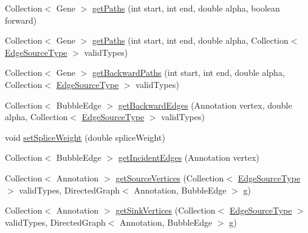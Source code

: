 \begin{DoxyCompactItemize}
Collection$<$ Gene $>$ \hyperlink{classbroad_1_1pda_1_1seq_1_1graph_1_1_chromosome_with_bubbles_j_graph_t_aa189999760ab15088e48c7fbcdc88bf0}{get\+Paths} (int start, int end, double alpha, boolean forward)
\item 
Collection$<$ Gene $>$ \hyperlink{classbroad_1_1pda_1_1seq_1_1graph_1_1_chromosome_with_bubbles_j_graph_t_afe50a9035a3a399d97bc80e5d68ae3ca}{get\+Paths} (int start, int end, double alpha, Collection$<$ \hyperlink{enumbroad_1_1pda_1_1seq_1_1graph_1_1_chromosome_with_bubbles_j_graph_t_1_1_edge_source_type}{Edge\+Source\+Type} $>$ valid\+Types)
\item 
Collection$<$ Gene $>$ \hyperlink{classbroad_1_1pda_1_1seq_1_1graph_1_1_chromosome_with_bubbles_j_graph_t_aeaf8d68a1b24e160b4ec49198d8029e5}{get\+Backward\+Paths} (int start, int end, double alpha, Collection$<$ \hyperlink{enumbroad_1_1pda_1_1seq_1_1graph_1_1_chromosome_with_bubbles_j_graph_t_1_1_edge_source_type}{Edge\+Source\+Type} $>$ valid\+Types)
\item 
Collection$<$ Bubble\+Edge $>$ \hyperlink{classbroad_1_1pda_1_1seq_1_1graph_1_1_chromosome_with_bubbles_j_graph_t_affa018ef5e00f853738fd8a21f32c949}{get\+Backward\+Edges} (Annotation vertex, double alpha, Collection$<$ \hyperlink{enumbroad_1_1pda_1_1seq_1_1graph_1_1_chromosome_with_bubbles_j_graph_t_1_1_edge_source_type}{Edge\+Source\+Type} $>$ valid\+Types)
\item 
void \hyperlink{classbroad_1_1pda_1_1seq_1_1graph_1_1_chromosome_with_bubbles_j_graph_t_a4fec10d865ea7836e3a74bb8875229de}{set\+Splice\+Weight} (double splice\+Weight)
\item 
Collection$<$ Bubble\+Edge $>$ \hyperlink{classbroad_1_1pda_1_1seq_1_1graph_1_1_chromosome_with_bubbles_j_graph_t_a445a09bc5b15d604661680071b926a38}{get\+Incident\+Edges} (Annotation vertex)
\item 
Collection$<$ Annotation $>$ \hyperlink{classbroad_1_1pda_1_1seq_1_1graph_1_1_chromosome_with_bubbles_j_graph_t_ad770bae6ab4a2477e609fa450d5a9bdf}{get\+Source\+Vertices} (Collection$<$ \hyperlink{enumbroad_1_1pda_1_1seq_1_1graph_1_1_chromosome_with_bubbles_j_graph_t_1_1_edge_source_type}{Edge\+Source\+Type} $>$ valid\+Types, Directed\+Graph$<$ Annotation, Bubble\+Edge $>$ g)
\item 
Collection$<$ Annotation $>$ \hyperlink{classbroad_1_1pda_1_1seq_1_1graph_1_1_chromosome_with_bubbles_j_graph_t_a8e54ddc31c8dff5537cd771bbb0a10e7}{get\+Sink\+Vertices} (Collection$<$ \hyperlink{enumbroad_1_1pda_1_1seq_1_1graph_1_1_chromosome_with_bubbles_j_graph_t_1_1_edge_source_type}{Edge\+Source\+Type} $>$ valid\+Types, Directed\+Graph$<$ Annotation, Bubble\+Edge $>$ g)

\end{DoxyCompactItemize}
